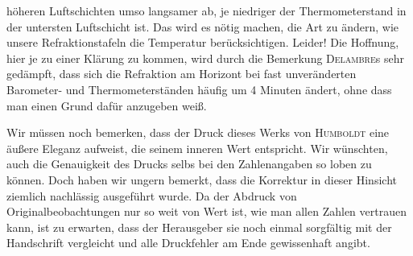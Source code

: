 höheren Luftschichten umso langsamer ab, je niedriger der Thermometerstand in der untersten Luftschicht ist. Das wird es nötig machen, die Art zu ändern, wie unsere Refraktionstafeln die Temperatur berücksichtigen. Leider! Die Hoffnung, hier je zu einer Klärung zu kommen, wird durch die Bemerkung \textsc{Delambre}s sehr gedämpft, dass sich die Refraktion am Horizont bei fast unveränderten Barometer- und Thermometerständen häufig um 4 Minuten ändert, ohne dass man einen Grund dafür anzugeben weiß.

Wir müssen noch bemerken, dass der Druck dieses Werks von \textsc{Humboldt} eine äußere Eleganz aufweist, die seinem inneren Wert entspricht. Wir wünschten, auch die Genauigkeit des Drucks selbs bei den Zahlenangaben so loben zu können. Doch haben wir ungern bemerkt, dass die Korrektur in dieser Hinsicht ziemlich nachlässig ausgeführt wurde. Da der Abdruck von Originalbeobachtungen nur so weit von Wert ist, wie man allen Zahlen vertrauen kann, ist zu erwarten, dass der Herausgeber sie noch einmal sorgfältig mit der Handschrift vergleicht und alle Druckfehler am Ende gewissenhaft angibt.
